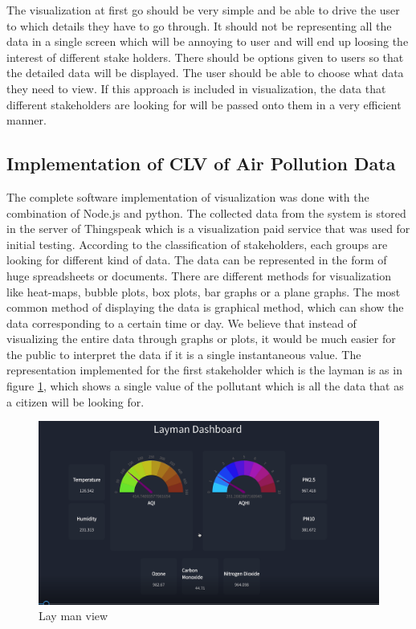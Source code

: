 The visualization at first go should be very simple and be able to drive the user to which details they have to go through. It should not be representing all the data in a single screen which will be annoying to user and will end up loosing the interest of different stake holders. There should be options given to users so that the detailed data will be displayed. The user should be able to choose what data they need to view. If this approach is included in visualization, the data that different stakeholders are looking for will be passed onto them in a very efficient manner.

\subsection{Implementation of CLV of Air Pollution Data}

The complete software implementation of visualization was done with the combination of Node.js and python. The collected data from the system is stored in the server of Thingspeak \cite{thingspeak} which is a visualization paid service that was used for initial testing. 
According to the classification of stakeholders, each groups are looking for different kind of data. The data can be represented in the form of huge spreadsheets or documents. There are different methods for visualization like heat-maps, bubble plots, box plots, bar graphs or a plane graphs. The most common method of displaying the data is graphical method, which can show the data corresponding to a certain time or day. We believe that instead of visualizing the entire data through graphs or plots, it would be much easier for the public to interpret the data if it is a single instantaneous value. The  representation implemented for the first stakeholder which is the layman is as in figure \ref{view1}, which shows a single value of the pollutant which is all the data that as a citizen will be looking for.

\begin{figure}[h]
  \begin{center}
  \includegraphics[scale=0.55]{./images/figure14.png}
  \end{center}
  \caption{Lay man view}
  \label{view1}
\end{figure}

